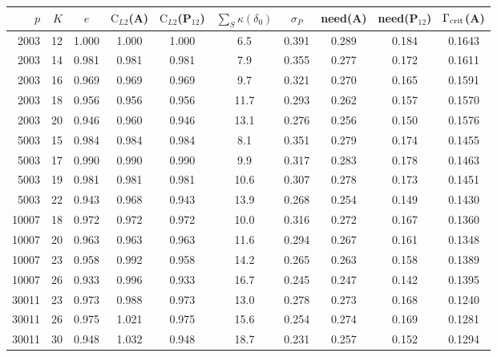 \begin{center}\small\begin{tabular}{rrcccccccc}\toprule
$p$ & $K$ & $e$ & $\mathrm C_{L2}$(A) & $\mathrm C_{L2}$(P$_{12}$) & $\sum_S\kappa(\delta_0)$ & $\sigma_P$ & need(A) & need(P$_{12}$) & $\Gamma_{\rm crit}$(A)\\\midrule
2003 & 12 & 1.000 & 1.000 & 1.000 & 6.5 & 0.391 & 0.289 & 0.184 & 0.1643\\
2003 & 14 & 0.981 & 0.981 & 0.981 & 7.9 & 0.355 & 0.277 & 0.172 & 0.1611\\
2003 & 16 & 0.969 & 0.969 & 0.969 & 9.7 & 0.321 & 0.270 & 0.165 & 0.1591\\
2003 & 18 & 0.956 & 0.956 & 0.956 & 11.7 & 0.293 & 0.262 & 0.157 & 0.1570\\
2003 & 20 & 0.946 & 0.960 & 0.946 & 13.1 & 0.276 & 0.256 & 0.150 & 0.1576\\
\midrule
5003 & 15 & 0.984 & 0.984 & 0.984 & 8.1 & 0.351 & 0.279 & 0.174 & 0.1455\\
5003 & 17 & 0.990 & 0.990 & 0.990 & 9.9 & 0.317 & 0.283 & 0.178 & 0.1463\\
5003 & 19 & 0.981 & 0.981 & 0.981 & 10.6 & 0.307 & 0.278 & 0.173 & 0.1451\\
5003 & 22 & 0.943 & 0.968 & 0.943 & 13.9 & 0.268 & 0.254 & 0.149 & 0.1430\\
\midrule
10007 & 18 & 0.972 & 0.972 & 0.972 & 10.0 & 0.316 & 0.272 & 0.167 & 0.1360\\
10007 & 20 & 0.963 & 0.963 & 0.963 & 11.6 & 0.294 & 0.267 & 0.161 & 0.1348\\
10007 & 23 & 0.958 & 0.992 & 0.958 & 14.2 & 0.265 & 0.263 & 0.158 & 0.1389\\
10007 & 26 & 0.933 & 0.996 & 0.933 & 16.7 & 0.245 & 0.247 & 0.142 & 0.1395\\
\midrule
30011 & 23 & 0.973 & 0.988 & 0.973 & 13.0 & 0.278 & 0.273 & 0.168 & 0.1240\\
30011 & 26 & 0.975 & 1.021 & 0.975 & 15.6 & 0.254 & 0.274 & 0.169 & 0.1281\\
30011 & 30 & 0.948 & 1.032 & 0.948 & 18.7 & 0.231 & 0.257 & 0.152 & 0.1294\\
\bottomrule\end{tabular}\end{center}
